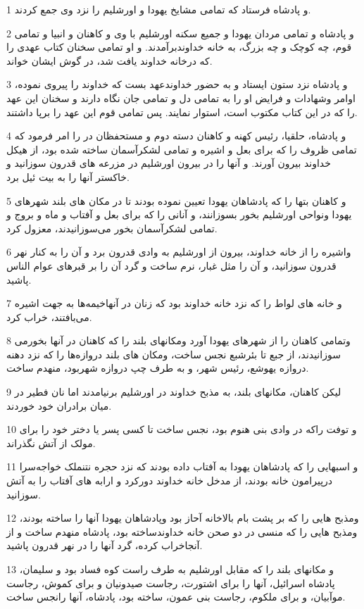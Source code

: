 \par 1 و پادشاه فرستاد که تمامی مشایخ یهودا و اورشلیم را نزد وی جمع کردند.
\par 2 و پادشاه و تمامی مردان یهودا و جمیع سکنه اورشلیم با وی و کاهنان و انبیا و تمامی قوم، چه کوچک و چه بزرگ، به خانه خداوندبرآمدند. و او تمامی سخنان کتاب عهدی را که درخانه خداوند یافت شد، در گوش ایشان خواند.
\par 3 و پادشاه نزد ستون ایستاد و به حضور خداوندعهد بست که خداوند را پیروی نموده، اوامر وشهادات و فرایض او را به تمامی دل و تمامی جان نگاه دارند و سخنان این عهد را که در این کتاب مکتوب است، استوار نمایند. پس تمامی قوم این عهد را برپا داشتند.
\par 4 و پادشاه، حلقیا، رئیس کهنه و کاهنان دسته دوم و مستحفظان در را امر فرمود که تمامی ظروف را که برای بعل و اشیره و تمامی لشکرآسمان ساخته شده بود، از هیکل خداوند بیرون آورند. و آنها را در بیرون اورشلیم در مزرعه های قدرون سوزانید و خاکستر آنها را به بیت ئیل برد.
\par 5 و کاهنان بتها را که پادشاهان یهودا تعیین نموده بودند تا در مکان های بلند شهرهای یهودا ونواحی اورشلیم بخور بسوزانند، و آنانی را که برای بعل و آفتاب و ماه و بروج و تمامی لشکرآسمان بخور می‌سوزانیدند، معزول کرد.
\par 6 واشیره را از خانه خداوند، بیرون از اورشلیم به وادی قدرون برد و آن را به کنار نهر قدرون سوزانید، و آن را مثل غبار، نرم ساخت و گرد آن را بر قبرهای عوام الناس پاشید.
\par 7 و خانه های لواط را که نزد خانه خداوند بود که زنان در آنهاخیمه‌ها به جهت اشیره می‌بافتند، خراب کرد. 
\par 8 وتمامی کاهنان را از شهرهای یهودا آورد ومکانهای بلند را که کاهنان در آنها بخورمی سوزانیدند، از جبع تا بئرشبع نجس ساخت، ومکان های بلند دروازه‌ها را که نزد دهنه دروازه یهوشع، رئیس شهر، و به طرف چپ دروازه شهربود، منهدم ساخت.
\par 9 لیکن کاهنان، مکانهای بلند، به مذبح خداوند در اورشلیم برنیامدند اما نان فطیر در میان برادران خود خوردند.
\par 10 و توفت راکه در وادی بنی هنوم بود، نجس ساخت تا کسی پسر یا دختر خود را برای مولک از آتش نگذراند.
\par 11 و اسبهایی را که پادشاهان یهودا به آفتاب داده بودند که نزد حجره نتنملک خواجه‌سرا درپیرامون خانه بودند، از مدخل خانه خداوند دورکرد و ارابه های آفتاب را به آتش سوزانید.
\par 12 ومذبح هایی را که بر پشت بام بالاخانه آحاز بود وپادشاهان یهودا آنها را ساخته بودند، ومذبح هایی را که منسی در دو صحن خانه خداوندساخته بود، پادشاه منهدم ساخت و از آنجاخراب کرده، گرد آنها را در نهر قدرون پاشید.
\par 13 و مکانهای بلند را که مقابل اورشلیم به طرف راست کوه فساد بود و سلیمان، پادشاه اسرائیل، آنها را برای اشتورت، رجاست صیدونیان و برای کموش، رجاست موآبیان، و برای ملکوم، رجاست بنی عمون، ساخته بود، پادشاه، آنها رانجس ساخت.
